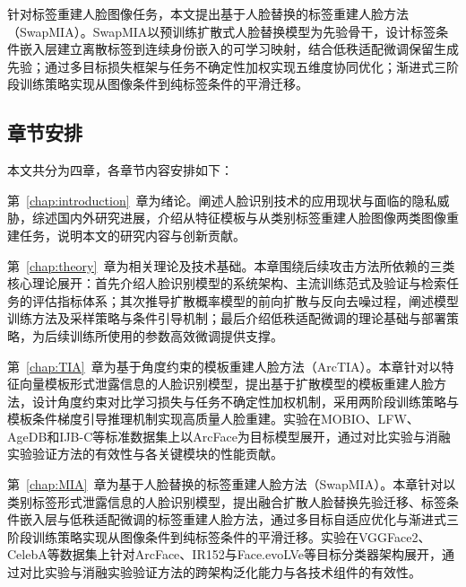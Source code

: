 针对标签重建人脸图像任务，本文提出基于人脸替换的标签重建人脸方法（SwapMIA）。SwapMIA以预训练扩散式人脸替换模型为先验骨干，设计标签条件嵌入层建立离散标签到连续身份嵌入的可学习映射，结合低秩适配微调保留生成先验；通过多目标损失框架与任务不确定性加权实现五维度协同优化；渐进式三阶段训练策略实现从图像条件到纯标签条件的平滑迁移。

\subsection{章节安排}

本文共分为四章，各章节内容安排如下：

第~\ref{chap:introduction}~章为绪论。阐述人脸识别技术的应用现状与面临的隐私威胁，综述国内外研究进展，介绍从特征模板与从类别标签重建人脸图像两类图像重建任务，说明本文的研究内容与创新贡献。

第~\ref{chap:theory}~章为相关理论及技术基础。本章围绕后续攻击方法所依赖的三类核心理论展开：首先介绍人脸识别模型的系统架构、主流训练范式及验证与检索任务的评估指标体系；其次推导扩散概率模型的前向扩散与反向去噪过程，阐述模型训练方法及采样策略与条件引导机制；最后介绍低秩适配微调的理论基础与部署策略，为后续训练所使用的参数高效微调提供支撑。

第~\ref{chap:TIA}~章为基于角度约束的模板重建人脸方法（ArcTIA）。本章针对以特征向量模板形式泄露信息的人脸识别模型，提出基于扩散模型的模板重建人脸方法，设计角度约束对比学习损失与任务不确定性加权机制，采用两阶段训练策略与模板条件梯度引导推理机制实现高质量人脸重建。实验在MOBIO、LFW、AgeDB和IJB-C等标准数据集上以ArcFace为目标模型展开，通过对比实验与消融实验验证方法的有效性与各关键模块的性能贡献。

第~\ref{chap:MIA}~章为基于人脸替换的标签重建人脸方法（SwapMIA）。本章针对以类别标签形式泄露信息的人脸识别模型，提出融合扩散人脸替换先验迁移、标签条件嵌入层与低秩适配微调的标签重建人脸方法，通过多目标自适应优化与渐进式三阶段训练策略实现从图像条件到纯标签条件的平滑迁移。实验在VGGFace2、CelebA等数据集上针对ArcFace、IR152与Face.evoLVe等目标分类器架构展开，通过对比实验与消融实验验证方法的跨架构泛化能力与各技术组件的有效性。

